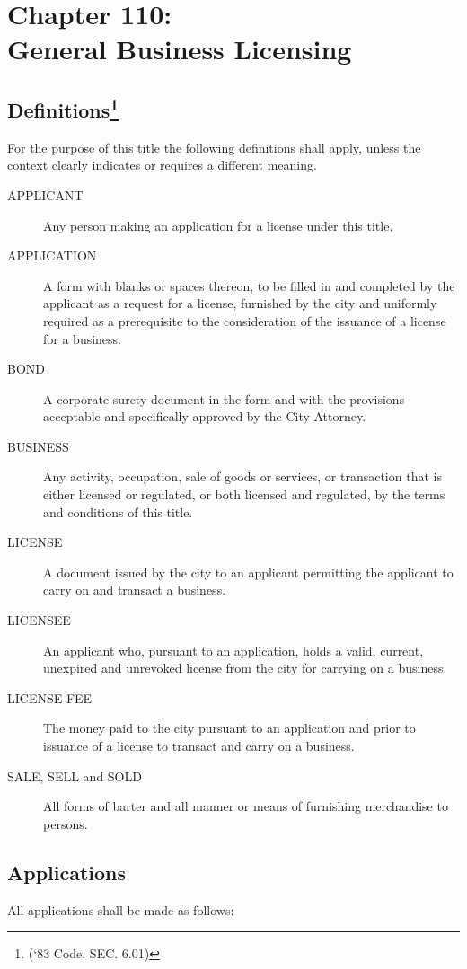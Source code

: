 \chapter*{Chapter 110: \\
	General Business Licensing}
    \minitoc
    \pagebreak

\section{Definitions\footnote{(‘83 Code, SEC. 6.01)}}
For the purpose of this title the following definitions shall apply, unless the context clearly indicates or requires a different meaning.
\begin{description}
    \item[APPLICANT]  Any person making an application for a license under this title.
    \item[APPLICATION]  A form with blanks or spaces thereon, to be filled in and completed by the applicant as a request for a license, furnished by the city and uniformly required as a prerequisite to the consideration of the issuance of a license for a business.
    \item[BOND]  A corporate surety document in the form and with the provisions acceptable and specifically approved by the City Attorney.
    \item[BUSINESS]  Any activity, occupation, sale of goods or services, or transaction that is either licensed or regulated, or both licensed and regulated, by the terms and conditions of this title.
    \item[LICENSE]  A document issued by the city to an applicant permitting the applicant to carry on and transact a business.
    \item[LICENSEE]  An applicant who, pursuant to an application, holds a valid, current, unexpired and unrevoked license from the city for carrying on a business.
    \item[LICENSE FEE]  The money paid to the city pursuant to an application and prior to issuance of a license to transact and carry on a business.
    \item[SALE, SELL and SOLD]  All forms of barter and all manner or means of furnishing merchandise to persons.
\end{description}

\section{Applications}
All applications shall be made as follows:
